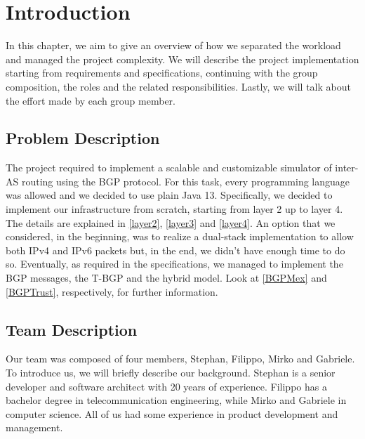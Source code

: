 \chapter{Introduction}
In this chapter, we aim to give an overview of how we separated the workload and managed the project complexity.
We will describe the project implementation starting from requirements and specifications, continuing with the group composition, the roles and the related responsibilities.
Lastly, we will talk about the effort made by each group member.

\section{Problem Description}
The project required to implement a scalable and customizable simulator of inter-AS routing using the BGP protocol.
For this task, every programming language was allowed and we decided to use plain Java 13.
Specifically, we decided to implement our infrastructure from scratch, starting from layer 2 up to layer 4. The details are explained in \ref{layer2}, \ref{layer3} and \ref{layer4}.
An option that we considered, in the beginning, was to realize a dual-stack implementation to allow both IPv4 and IPv6 packets but, in the end, we didn't have enough time to do so.
Eventually, as required in the specifications, we managed to implement the BGP messages, the T-BGP and the hybrid model. Look at \ref{BGPMex} and \ref{BGPTrust}, respectively, for further information.

\section{Team Description}
Our team was composed of four members, Stephan, Filippo, Mirko and Gabriele. To introduce us, we will briefly describe our background.\newline
Stephan is a senior developer and software architect with 20 years of experience.\newline
Filippo has a bachelor degree in telecommunication engineering, while Mirko and Gabriele in computer science.\newline
All of us had some experience in product development and management.

